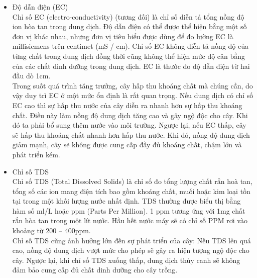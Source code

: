 \documentclass[a4paper,12pt,oneside]{article}
\begin{document}
\begin{itemize}
\item Độ dẫn điện (EC)\\
Chỉ số EC (electro-conductivity) (tương đối) là chỉ số diễn tả tổng nồng độ ion hòa tan trong dung dịch. Độ dẫn điện có thể được thể hiện bằng một số đơn vị khác nhau, nhưng đơn vị tiêu biểu được dùng để đo lường EC là millisiemens trên centimet (mS / cm). Chỉ số EC không diễn tả nồng độ của từng chất trong dung dịch đồng thời cũng không thể hiện mức độ cân bằng của các chất dinh dưỡng trong dung dịch. EC là thước đo độ dẫn điện từ hai đầu dò 1cm.\\
Trong suốt quá trình tăng trưởng, cây hấp thu khoáng chất mà chúng cần, do vậy duy trì EC ở một mức ổn định là rất quan trọng. Nếu dung dịch có chỉ số EC cao thì sự hấp thu nước của cây diễn ra nhanh hơn sự hấp thu khoáng chất. Điều này làm nồng độ dung dịch tăng cao và gây ngộ độc cho cây. Khi đó ta phải bổ sung thêm nước vào môi trường. Ngược lại, nếu EC thấp, cây sẽ hấp thu khoáng chất nhanh hơn hấp thu nước. Khi đó, nồng độ dung dịch giảm mạnh, cây sẽ không được cung cấp đầy đủ khoáng chất, chậm lớn và phát triển kém.

\item Chỉ số TDS\\
Chỉ số TDS (Total Dissolved Solids) là chỉ số đo tổng lượng chất rắn hoà tan, tổng số các ion mang điện tích bao gồm khoáng chất, muối hoặc kim loại tồn tại trong một khối lượng nước nhất định. TDS thường được biểu thị bằng hàm số ml/L hoặc ppm (Parts Per Million). 1 ppm tương ứng với 1mg chất rắn hòa tan trong một lít nước. Hầu hết nước máy sẽ có chỉ số PPM rơi vào khoảng từ 200 – 400ppm.\\
Chỉ số TDS cũng ảnh hưởng lớn đến sự phát triển của cây: Nếu TDS lên quá cao, nồng độ dung dịch vượt mức cho phép sẽ gây ra hiện tượng ngộ độc cho cây. Ngược lại, khi chỉ số TDS xuống thấp, dung dịch thủy canh sẽ không đảm bảo cung cấp đủ chất dinh dưỡng cho cây trồng.


\end{itemize}
\end{document}
